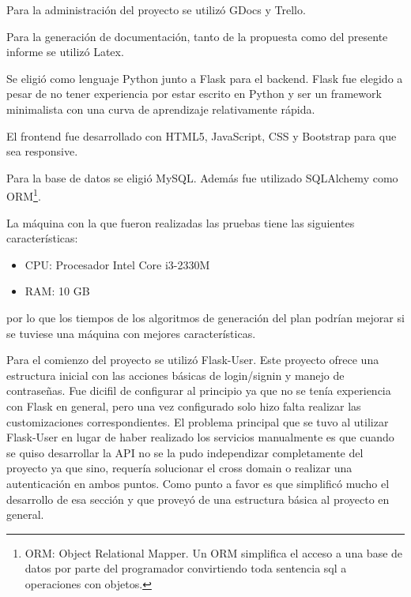 \documentclass[a4paper]{article}
\begin{document}
Para la administración del proyecto se utilizó GDocs y Trello.\newline

Para la generación de documentación, tanto de la propuesta como del presente informe se utilizó Latex.\newline

Se eligió como lenguaje Python junto a Flask\cite{FLASK_OFICIAL} para el backend. Flask fue elegido a pesar de no tener experiencia por estar escrito en Python y ser un framework minimalista con una curva de aprendizaje relativamente rápida.\newline

El frontend fue desarrollado con HTML5, JavaScript, CSS y Bootstrap\cite{BOOTSTRAP} para que sea responsive.\newline

Para la base de datos se eligió MySQL\cite{MYSQL}. Además fue utilizado SQLAlchemy\cite{SQLALCHEMY_OFICIAL} como ORM\footnote{ORM: Object Relational Mapper. Un ORM simplifica el acceso a una base de datos por parte del programador convirtiendo toda sentencia sql a operaciones con objetos.}.\newline

La máquina con la que fueron realizadas las pruebas tiene las siguientes características:
\begin{itemize}
	\item CPU: Procesador Intel Core i3-2330M
	\item RAM: 10 GB
\end{itemize}
por lo que los tiempos de los algoritmos de generación del plan podrían mejorar si se tuviese una máquina con mejores características.\newline

Para el comienzo del proyecto se utilizó Flask-User\cite{FLASK_USER}. Este proyecto ofrece una estructura inicial con las acciones básicas de login/signin y manejo de contraseñas. Fue dicifil de configurar al principio ya que no se tenía experiencia con Flask en general, pero una vez configurado solo hizo falta realizar las customizaciones correspondientes. El problema principal que se tuvo al utilizar Flask-User en lugar de haber realizado los servicios manualmente es que cuando se quiso desarrollar la API no se la pudo independizar completamente del proyecto ya que sino, requería solucionar el cross domain o realizar una autenticación en ambos puntos. Como punto a favor es que simplificó mucho el desarrollo de esa sección y que proveyó de una estructura básica al proyecto en general.\newline
\end{document}

